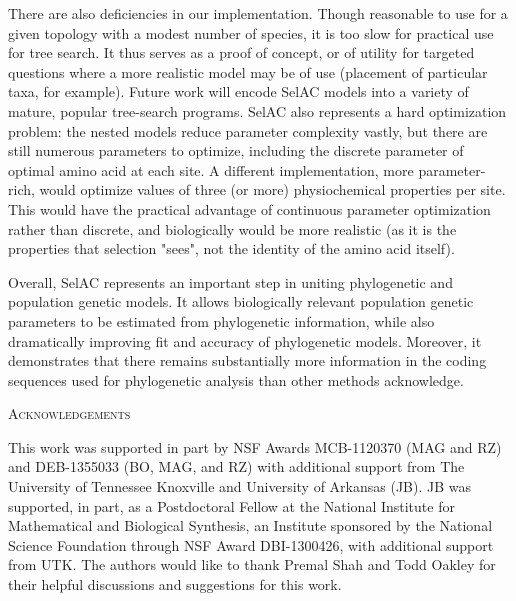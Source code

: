 \documentclass[12pt,letterpaper]{article}
\renewcommand{\section}[1]{%
\bigskip
\begin{center}
\begin{Large}
\normalfont\scshape #1
\medskip
\end{Large}
\end{center}}
\newcommand{\selac}{SelAC\xspace}
\begin{document}
There are also deficiencies in our implementation.
Though reasonable to use for a given topology with a modest number of species, it is too slow for practical use for tree search.
It thus serves as a proof of concept, or of utility for targeted questions where a more realistic model may be of use (placement of particular taxa, for example).
Future work will encode \selac models into a variety of mature, popular tree-search programs.
\selac also represents a hard optimization problem: the nested models reduce parameter complexity vastly, but there are still numerous parameters to optimize, including the discrete parameter of optimal amino acid at each site.
A different implementation, more parameter-rich, would optimize values of three (or more) physiochemical properties per site.
This would have the practical advantage of continuous parameter optimization rather than discrete, and biologically would be more realistic (as it is the properties that selection "sees", not the identity of the amino acid itself).

Overall, \selac represents an important step in uniting phylogenetic and population genetic models.
It allows biologically relevant population genetic parameters to be estimated from phylogenetic information, while also dramatically improving fit and accuracy of phylogenetic models.
Moreover, it demonstrates that there remains substantially more information in the coding sequences used for phylogenetic analysis than other methods acknowledge.

\section{Acknowledgements}
This work was supported in part by NSF Awards MCB-1120370 (MAG and RZ) and DEB-1355033 (BO, MAG, and RZ) with additional support from The University of Tennessee Knoxville and University of Arkansas (JB).
JB was supported, in part, as a Postdoctoral Fellow at the National Institute for Mathematical and Biological Synthesis, an Institute sponsored by the National Science Foundation through NSF Award DBI-1300426, with additional support from UTK.
The authors would like to thank Premal Shah and Todd Oakley for their helpful discussions and suggestions for this work.
\clearpage



%
\renewcommand\refname{\begin{center}{\normalfont\scshape References}\end{center}}

\end{document}
